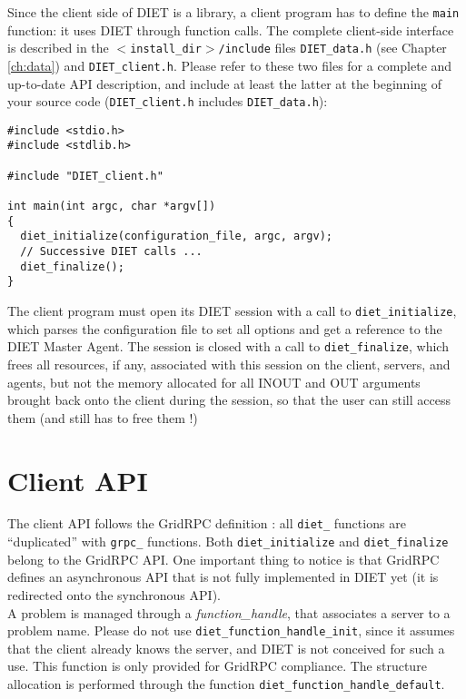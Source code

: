 Since the client side of DIET is a library, a client program has to define the
\texttt{main} function: it uses DIET through function calls. The complete
client-side interface is described in the \texttt{$<$install\_dir$>$/include}
files \texttt{DIET\_data.h} (see Chapter \ref{ch:data}) and
\texttt{DIET\_client.h}. Please refer to these two files for a complete and
up-to-date API description, and include at least the latter at the beginning of
your source code (\texttt{DIET\_client.h} includes \texttt{DIET\_data.h}):
{\footnotesize
\begin{verbatim}
#include <stdio.h>
#include <stdlib.h>

#include "DIET_client.h"

int main(int argc, char *argv[])
{
  diet_initialize(configuration_file, argc, argv);
  // Successive DIET calls ...
  diet_finalize();
}
\end{verbatim}
}

The client program must open its DIET session with a call to
\texttt{diet\_initialize}, which parses the configuration file to set
all options and get a reference to the DIET Master Agent. The session
is closed with a call to \texttt{diet\_finalize}, which frees all
resources, if any, associated with this session on the client, servers,
and agents, but not the memory allocated for all INOUT and OUT
arguments brought back onto the client during the session, so that the
user can still access them (and still has to free them !)


\section{Client API}
\label{sec:clAPI}

The client API follows the GridRPC definition \cite{gridRPC:02}: all
\texttt{diet\_} functions are ``duplicated'' with \texttt{grpc\_}
functions.  Both \texttt{diet\_initialize} and \texttt{diet\_finalize}
belong to the GridRPC API.  One important thing to notice is that
GridRPC defines an asynchronous API that is not fully implemented in
DIET yet (it is redirected onto the synchronous API).  \\

A problem is managed through a \emph{function\_handle}, that associates a server
to a problem name. Please do not use \texttt{diet\_function\_handle\_init},
since it assumes that the client already knows the server, and DIET is not
conceived for such a use. This function is only provided for GridRPC
compliance. The structure allocation is performed through the function
\texttt{diet\_function\_handle\_default}.

